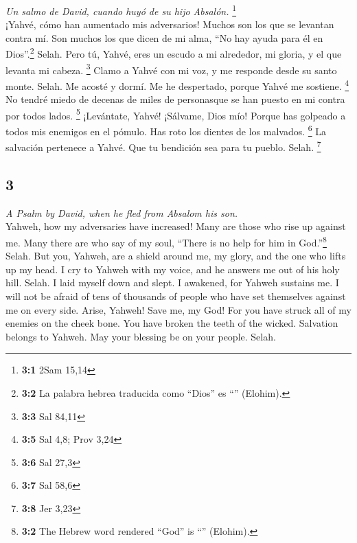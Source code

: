\begin{paracol}{2}
\emph{Un salmo de David, cuando huyó de su hijo Absalón.} \footnote{\textbf{3:1}
  2Sam 15,14}\\
 ¡Yahvé, cómo han aumentado mis adversarios! Muchos son
los que se levantan contra mí.  Son muchos los que dicen
de mi alma, ``No hay ayuda para él en Dios''.\footnote{\textbf{3:2} La
  palabra hebrea traducida como ``Dios'' es ``'' (Elohim).}
Selah.  Pero tú, Yahvé, eres un escudo a mi alrededor, mi
gloria, y el que levanta mi cabeza. \footnote{\textbf{3:3} Sal 84,11}
 Clamo a Yahvé con mi voz, y me responde desde su santo
monte. Selah.  Me acosté y dormí. Me he despertado, porque
Yahvé me sostiene. \footnote{\textbf{3:5} Sal 4,8; Prov 3,24}
 No tendré miedo de decenas de miles de personasque se han
puesto en mi contra por todos lados. \footnote{\textbf{3:6} Sal 27,3}
 ¡Levántate, Yahvé! ¡Sálvame, Dios mío! Porque has
golpeado a todos mis enemigos en el pómulo. Has roto los dientes de los
malvados. \footnote{\textbf{3:7} Sal 58,6}  La salvación
pertenece a Yahvé. Que tu bendición sea para tu pueblo. Selah.
\footnote{\textbf{3:8} Jer 3,23}

\switchcolumn
\begin{otherlanguage}{english}

\hypertarget{section-5}{%
\section{3}\label{section-5}}

\emph{A Psalm by David, when he fled from Absalom his son.}\\
 Yahweh, how my adversaries have increased! Many are those
who rise up against me.  Many there are who say of my
soul, ``There is no help for him in God.''\footnote{\textbf{3:2} The
  Hebrew word rendered ``God'' is ``'' (Elohim).} Selah.
 But you, Yahweh, are a shield around me, my glory, and
the one who lifts up my head.  I cry to Yahweh with my
voice, and he answers me out of his holy hill. Selah.  I
laid myself down and slept. I awakened, for Yahweh sustains me.
 I will not be afraid of tens of thousands of people who
have set themselves against me on every side.  Arise,
Yahweh! Save me, my God! For you have struck all of my enemies on the
cheek bone. You have broken the teeth of the wicked. 
Salvation belongs to Yahweh. May your blessing be on your people. Selah.


\end{otherlanguage}
\end{paracol}
